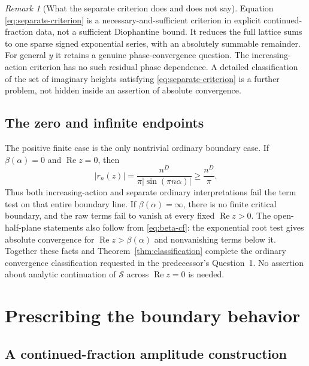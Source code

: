 \documentclass[11pt,a4paper]{article}
\numberwithin{equation}{section}
\theoremstyle{definition}
\theoremstyle{remark}
\newtheorem{remark}[theorem]{Remark}
\newcommand{\re}{\operatorname{Re}}
\newcommand{\Ssum}{\mathcal S}
\begin{document}
\begin{remark}[What the separate criterion does and does not say]
Equation \eqref{eq:separate-criterion} is a necessary-and-sufficient
criterion in explicit continued-fraction data, not a sufficient
Diophantine bound. It reduces the full lattice sums to one sparse
signed exponential series, with an absolutely summable remainder.
For general $y$ it retains a genuine phase-convergence question. The
increasing-action criterion has no such residual phase dependence.
A detailed classification of the set of imaginary heights satisfying
\eqref{eq:separate-criterion} is a further problem, not hidden inside
an assertion of absolute convergence.
\end{remark}

\subsection{The zero and infinite endpoints}
The positive finite case is the only nontrivial ordinary boundary
case. If $\beta(\alpha)=0$ and $\re z=0$, then
\[
 |r_n(z)|=\frac{n^D}{\pi|\sin(\pi n\alpha)|}\ge\frac{n^D}{\pi}.
\]
Thus both increasing-action and separate ordinary interpretations fail
the term test on that entire boundary line. If $\beta(\alpha)=\infty$,
there is no finite critical boundary, and the raw terms fail to vanish
at every fixed $\re z>0$. The open-half-plane statements also follow
from \eqref{eq:beta-cf}: the exponential root test gives absolute
convergence for $\re z>\beta(\alpha)$ and nonvanishing terms below it.
Together these facts and Theorem~\ref{thm:classification} complete the
ordinary convergence classification requested in the predecessor's
Question~1. No assertion about analytic continuation of $\Ssum$ across
$\re z=0$ is needed.

\section{Prescribing the boundary behavior}
\label{sec:realization}

\subsection{A continued-fraction amplitude construction}
\end{document}
